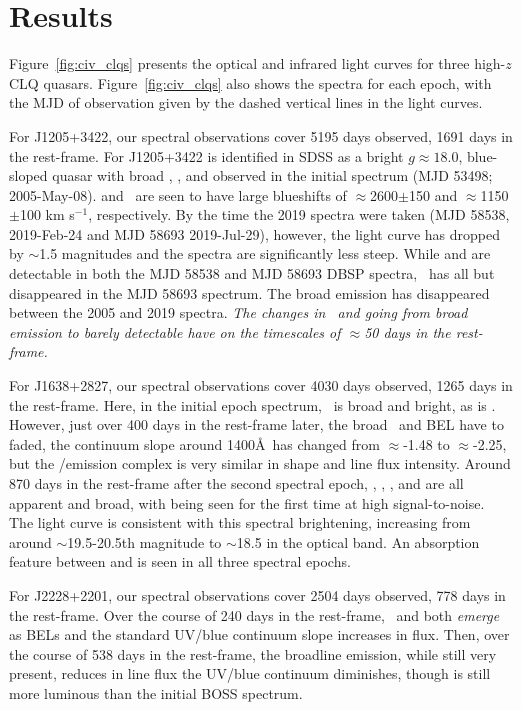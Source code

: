 \documentclass[a4paper,fleqn,usenatbib]{mnras}
\begin{document}
\section{Results}
Figure~\ref{fig:civ_clqs} presents the optical and infrared light
curves for three high-$z$ CLQ quasars.  Figure~\ref{fig:civ_clqs} also
shows the spectra for each epoch, with the MJD of observation given by
the dashed vertical lines in the light curves.

For J1205+3422, our spectral observations cover 5195 days observed, 1691 days
in the rest-frame. For J1205+3422 is identified in SDSS as a bright
$g\approx18.0$, blue-sloped quasar with broad \siiv, \civ, \ciii and
\mgii observed in the initial spectrum (MJD 53498; 2005-May-08). \ciii
and \civ\ are seen to have large blueshifts of $\approx$2600$\pm$150
and $\approx$1150$\pm$100 km s$^{-1}$, respectively.  By the time the
2019 spectra were taken (MJD 58538, 2019-Feb-24 and MJD 58693
2019-Jul-29), however, the light curve has dropped by $\sim$1.5
magnitudes and the spectra are significantly less steep.  While \lya
and \nv are detectable in both the MJD 58538 and MJD 58693 DBSP
spectra, \civ\ has all but disappeared in the MJD 58693 spectrum.  The
broad \ciii emission has disappeared between the 2005 and 2019
spectra. {\it The changes in \civ\ and \ciii going from broad emission to
barely detectable have on the timescales of $\approx$50 days in the rest-frame.} 

For J1638+2827, our spectral observations cover 4030 days observed, 1265 days
in the rest-frame. Here, in the initial epoch spectrum, \civ\ is broad
and bright, as is \ciii. However, just over 400 days in the rest-frame
later, the broad \civ\ and \ciii BEL have to faded, the continuum
slope around 1400\AA\ has changed from $\approx$-1.48 to
$\approx$-2.25, but the \lya/\nv emission complex is very similar in
shape and line flux intensity. Around 870 days in the rest-frame after
the second spectral epoch, \lya, \nv, \civ, \ciii and \mgii are all
apparent and broad, with \mgii being seen for the first time at high
signal-to-noise. The light curve is consistent with this spectral
brightening, increasing from around $\sim$19.5-20.5th magnitude to
$\sim$18.5 in the optical band. An absorption feature between  \lya and \nv
is seen in all three spectral epochs. 

For J2228+2201, our spectral observations cover 2504 days observed,
778 days in the rest-frame. Over the course of 240 days in the rest-frame, \civ\ and \ciii both {\it emerge} as BELs and
the standard UV/blue continuum slope increases in flux.
Then, over the course of 538 days in the rest-frame, the broadline emission, while still
very present, reduces in line flux the UV/blue continuum diminishes,
though is still more luminous than the initial BOSS spectrum. 
\end{document}
